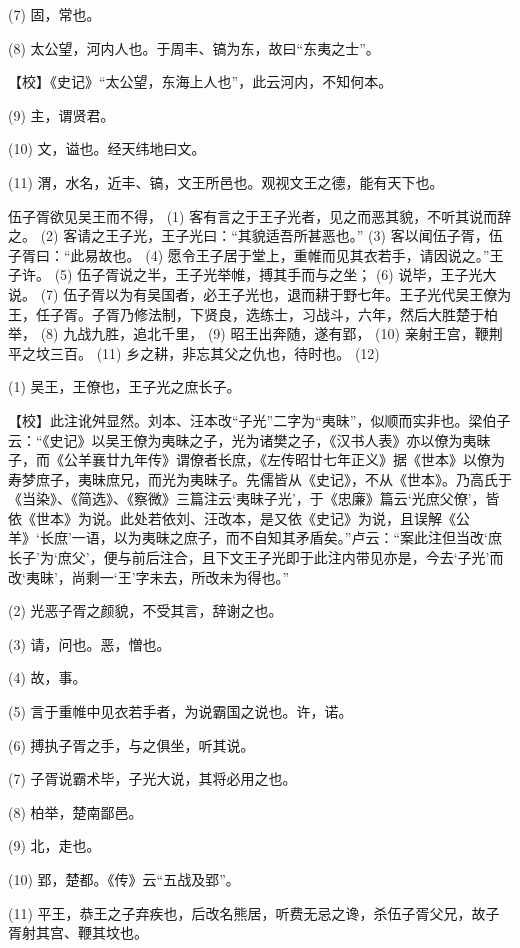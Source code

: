 \documentclass[12pt,UTF8]{ctexbook}
\begin{document}
(7) 固，常也。

(8) 太公望，河内人也。于周丰、镐为东，故曰“东夷之士”。

【校】《史记》“太公望，东海上人也”，此云河内，不知何本。

(9) 主，谓贤君。

(10) 文，谥也。经天纬地曰文。

(11) 渭，水名，近丰、镐，文王所邑也。观视文王之德，能有天下也。

伍子胥欲见吴王而不得， (1) 客有言之于王子光者，见之而恶其貌，不听其说而辞之。 (2) 客请之王子光，王子光曰：“其貌适吾所甚恶也。” (3) 客以闻伍子胥，伍子胥曰：“此易故也。 (4) 愿令王子居于堂上，重帷而见其衣若手，请因说之。”王子许。 (5) 伍子胥说之半，王子光举帷，搏其手而与之坐； (6) 说毕，王子光大说。 (7) 伍子胥以为有吴国者，必王子光也，退而耕于野七年。王子光代吴王僚为王，任子胥。子胥乃修法制，下贤良，选练士，习战斗，六年，然后大胜楚于柏举， (8) 九战九胜，追北千里， (9) 昭王出奔随，遂有郢， (10) 亲射王宫，鞭荆平之坟三百。 (11) 乡之耕，非忘其父之仇也，待时也。 (12)

(1) 吴王，王僚也，王子光之庶长子。

【校】此注讹舛显然。刘本、汪本改“子光”二字为“夷昧”，似顺而实非也。梁伯子云：“《史记》以吴王僚为夷昧之子，光为诸樊之子，《汉书人表》亦以僚为夷昧子，而《公羊襄廿九年传》谓僚者长庶，《左传昭廿七年正义》据《世本》以僚为寿梦庶子，夷昧庶兄，而光为夷昧子。先儒皆从《史记》，不从《世本》。乃高氏于《当染》、《简选》、《察微》三篇注云‘夷昧子光’，于《忠廉》篇云‘光庶父僚’，皆依《世本》为说。此处若依刘、汪改本，是又依《史记》为说，且误解《公羊》‘长庶’一语，以为夷昧之庶子，而不自知其矛盾矣。”卢云：“案此注但当改‘庶长子’为‘庶父’，便与前后注合，且下文王子光即于此注内带见亦是，今去‘子光’而改‘夷昧’，尚剩一‘王’字未去，所改未为得也。”

(2) 光恶子胥之颜貌，不受其言，辞谢之也。

(3) 请，问也。恶，憎也。

(4) 故，事。

(5) 言于重帷中见衣若手者，为说霸国之说也。许，诺。

(6) 搏执子胥之手，与之俱坐，听其说。

(7) 子胥说霸术毕，子光大说，其将必用之也。

(8) 柏举，楚南鄙邑。

(9) 北，走也。

(10) 郢，楚都。《传》云“五战及郢”。

(11) 平王，恭王之子弃疾也，后改名熊居，听费无忌之谗，杀伍子胥父兄，故子胥射其宫、鞭其坟也。
\end{document}
